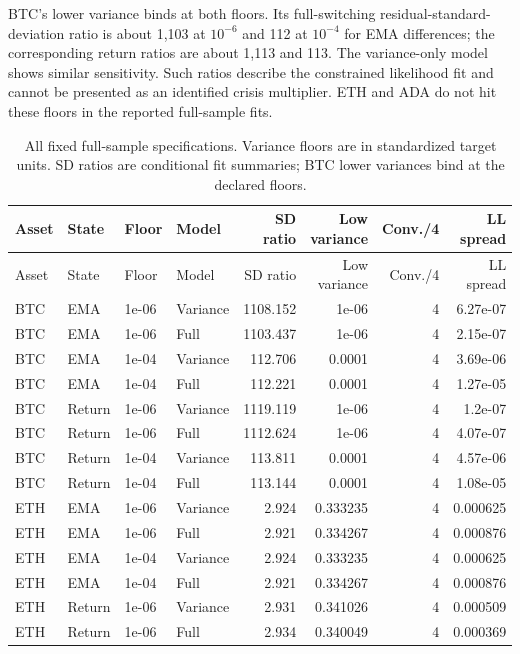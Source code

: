 BTC's lower variance binds at both floors. Its full-switching residual-standard-deviation ratio is about 1,103 at $10^{-6}$ and 112 at $10^{-4}$ for EMA differences; the corresponding return ratios are about 1,113 and 113. The variance-only model shows similar sensitivity. Such ratios describe the constrained likelihood fit and cannot be presented as an identified crisis multiplier. ETH and ADA do not hit these floors in the reported full-sample fits.

{\footnotesize
\begin{longtable}{llllrrrr}
\caption{All fixed full-sample specifications. Variance floors are in standardized target units. SD ratios are conditional fit summaries; BTC lower variances bind at the declared floors.}\label{tab:regime_floor_sensitivity}\\
\toprule Asset & State & Floor & Model & SD ratio & Low variance & Conv./4 & LL spread\\\midrule\endfirsthead
\toprule Asset & State & Floor & Model & SD ratio & Low variance & Conv./4 & LL spread\\\midrule\endhead
\bottomrule\endfoot
BTC & EMA & 1e-06 & Variance & 1108.152 & 1e-06 & 4 & 6.27e-07\\
BTC & EMA & 1e-06 & Full & 1103.437 & 1e-06 & 4 & 2.15e-07\\
BTC & EMA & 1e-04 & Variance & 112.706 & 0.0001 & 4 & 3.69e-06\\
BTC & EMA & 1e-04 & Full & 112.221 & 0.0001 & 4 & 1.27e-05\\
BTC & Return & 1e-06 & Variance & 1119.119 & 1e-06 & 4 & 1.2e-07\\
BTC & Return & 1e-06 & Full & 1112.624 & 1e-06 & 4 & 4.07e-07\\
BTC & Return & 1e-04 & Variance & 113.811 & 0.0001 & 4 & 4.57e-06\\
BTC & Return & 1e-04 & Full & 113.144 & 0.0001 & 4 & 1.08e-05\\
ETH & EMA & 1e-06 & Variance & 2.924 & 0.333235 & 4 & 0.000625\\
ETH & EMA & 1e-06 & Full & 2.921 & 0.334267 & 4 & 0.000876\\
ETH & EMA & 1e-04 & Variance & 2.924 & 0.333235 & 4 & 0.000625\\
ETH & EMA & 1e-04 & Full & 2.921 & 0.334267 & 4 & 0.000876\\
ETH & Return & 1e-06 & Variance & 2.931 & 0.341026 & 4 & 0.000509\\
ETH & Return & 1e-06 & Full & 2.934 & 0.340049 & 4 & 0.000369\\

\end{longtable}}
